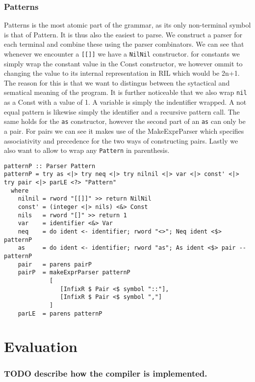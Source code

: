 \documentclass[a4paper]{article}
\begin{document}
\subsubsection{Patterns}
\label{sec:org2dfd57b}
Patterns is the most atomic part of the grammar, as its only non-terminal symbol is that of Pattern. It is thus also the easiest to parse. We construct a parser for each terminal and combine these using the parser combinators.
We can see that whenever we encounter a \texttt{[[]]} we have a \texttt{NilNil} constructor. for constants we simply wrap the constant value in the Const constructor, we however ommit to changing the value to its internal representation in RIL which would be 2n+1. The reason for this is that we want to distingus between the sytactical and sematical meaning of the program. It is further noticeable that we also wrap \texttt{nil} as a Const with a value of 1.
A variable is simply the indentifier wrapped.
A not equal pattern is likewise simply the identifier and a recursive pattern call. The same holds for the \texttt{as} constructor, however the second part of an \texttt{as} can only be a pair. For pairs we can see it makes use of the MakeExprParser which specifies associativity and precedence for the two ways of constructing pairs.
Lastly we also want to allow to wrap any \texttt{Pattern} in parenthesis.
\begin{verbatim}
patternP :: Parser Pattern
patternP = try as <|> try neq <|> try nilnil <|> var <|> const' <|> try pair <|> parLE <?> "Pattern"
  where
    nilnil = rword "[[]]" >> return NilNil
    const' = (integer <|> nils) <&> Const
    nils   = rword "[]" >> return 1
    var    = identifier <&> Var
    neq    = do ident <- identifier; rword "<>"; Neq ident <$> patternP
    as     = do ident <- identifier; rword "as"; As ident <$> pair --patternP
    pair   = parens pairP
    pairP  = makeExprParser patternP
             [
                [InfixR $ Pair <$ symbol "::"],
                [InfixR $ Pair <$ symbol ","]
             ]
    parLE  = parens patternP
\end{verbatim}
\section{Evaluation}
\label{sec:org1a6ee6b}
\subsubsection{{\bfseries\sffamily TODO} describe how the compiler is implemented.}
\label{sec:org5c1837a}
\end{document}
